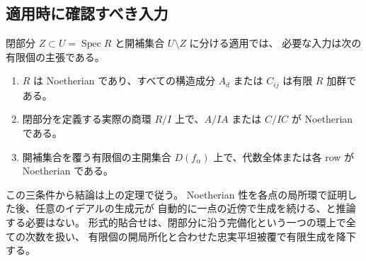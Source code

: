 \subsection{適用時に確認すべき入力}

閉部分 $Z\subset U=\operatorname{Spec} R$ と開補集合 $U\setminus Z$ に分ける適用では、
必要な入力は次の有限個の主張である。
\begin{enumerate}
 \item $R$ は Noetherian であり、すべての構造成分 $A_d$ または $C_{ij}$ は有限 $R$ 加群である。
 \item 閉部分を定義する実際の商環 $R/I$ 上で、$A/IA$ または $C/IC$ が Noetherian である。
 \item 開補集合を覆う有限個の主開集合 $D(f_\alpha)$ 上で、代数全体または各 row が Noetherian である。
\end{enumerate}
この三条件から結論は上の定理で従う。
Noetherian 性を各点の局所環で証明した後、任意のイデアルの生成元が
自動的に一点の近傍で生成を続ける、と推論する必要はない。
形式的貼合せは、閉部分に沿う完備化という一つの環上で全ての次数を扱い、
有限個の開局所化と合わせた忠実平坦被覆で有限生成を降下する。


